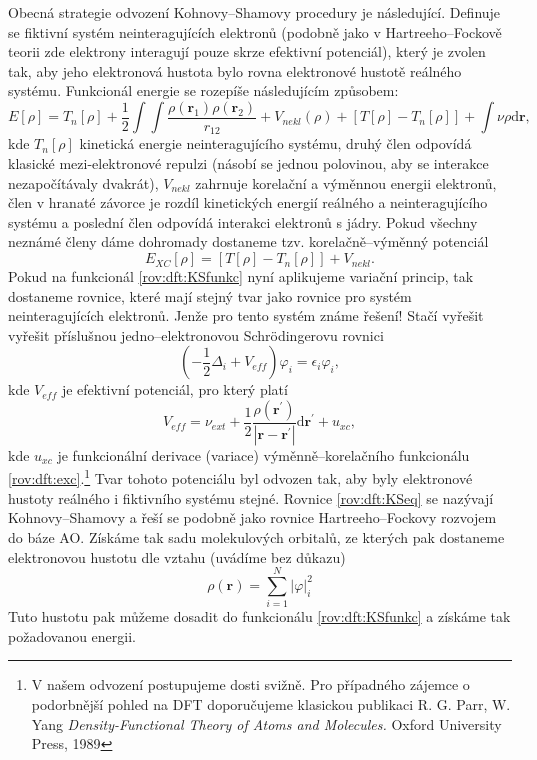 Obecná strategie odvození Kohnovy--Shamovy procedury je následující. Definuje se fiktivní systém neinteragujících elektronů (podobně jako v Hartreeho--Fockově teorii zde elektrony interagují pouze skrze efektivní potenciál), který je zvolen tak, aby jeho elektronová hustota bylo rovna elektronové hustotě reálného systému. 
Funkcionál energie se rozepíše následujícím způsobem:
\begin{equation}
E[\rho]= T_{n}[\rho] + \frac{1}{2}\int \int \frac{\rho(\textbf{r}_1)\rho(\textbf{r}_2)}{r_{12}} + V_{nekl}(\rho) +\left[T[\rho]-T_{n}[\rho]\right] + \int \nu \rho \mathrm{d}\textbf{r},
\label{rov:dft:KSfunkc}
\end{equation}
kde $T_{n}[\rho]$ kinetická energie neinteragujícího systému, druhý člen odpovídá klasické mezi-elektronové repulzi (násobí se jednou polovinou, aby se interakce nezapočítávaly dvakrát), $V_{nekl}$ zahrnuje korelační a výměnnou energii elektronů, člen v hranaté závorce je rozdíl kinetických energií reálného a neinteragujícího systému  a poslední člen odpovídá interakci elektronů s jádry. Pokud všechny neznámé členy dáme dohromady dostaneme tzv. korelačně--výměnný potenciál
\begin{equation}	
E_{XC}[\rho]=\left[T[\rho]-T_{n}[\rho]\right] +  V_{nekl} .
\label{rov:dft:exc}
\end{equation}
Pokud na funkcionál \eqref{rov:dft:KSfunkc} nyní aplikujeme variační princip, tak dostaneme rovnice, které mají stejný tvar jako rovnice
pro systém neinteragujících elektronů. Jenže pro tento systém známe řešení! Stačí vyřešit vyřešit příslušnou jedno--elektronovou  	 Schr\"{o}dingerovu rovnici
\begin{equation}
\left(-\frac{1}{2}\Delta_i + V_{eff} \right) \varphi_i =\epsilon_i \varphi_i ,
\label{rov:dft:KSeq}
\end{equation}
kde $V_{eff}$ je efektivní potenciál, pro který platí
\begin{equation}
V_{eff}=\nu_{ext}+\frac{1}{2}\frac{\rho(\textbf{r}^{\prime})}{|\textbf{r}-\textbf{r}^{\prime}|}\mathrm{d}\textbf{r}^{\prime}+u_{xc} ,
\end{equation}
kde $u_{xc}$ je funkcionální derivace (variace) výměnně--korelačního funkcionálu \ref{rov:dft:exc}.\footnote{V našem odvození postupujeme dosti svižně. Pro případného zájemce o podorbnější pohled na DFT doporučujeme klasickou publikaci R. G. Parr, W. Yang \textit{Density-Functional Theory of Atoms and Molecules.} Oxford University Press, 1989} Tvar tohoto potenciálu byl odvozen tak, aby byly elektronové hustoty reálného i fiktivního systému stejné.
Rovnice \ref{rov:dft:KSeq} se nazývají Kohnovy--Shamovy a řeší se podobně jako rovnice Hartreeho--Fockovy rozvojem do báze AO.
Získáme tak sadu molekulových orbitalů, ze kterých pak dostaneme elektronovou hustotu dle vztahu (uvádíme bez důkazu)
\begin{equation}
\rho(\textbf{r}) = \sum_{i=1}^N |\varphi|_i^2
\label{rov:dft:KSrho}
\end{equation}
Tuto hustotu pak můžeme dosadit do funkcionálu \eqref{rov:dft:KSfunkc} a získáme tak požadovanou energii.


